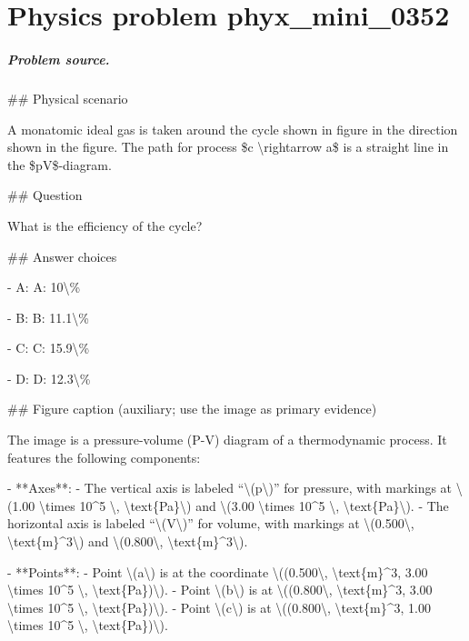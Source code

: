 
\chapter{Physics problem phyx\_mini\_0352}
\label{ch:PhyXMiniProblems_problem_phyx_mini_0352}

\paragraph{Problem source.}
\#\# Physical scenario

A monatomic ideal gas is taken around the cycle shown in figure in the direction shown in the figure. The path for process \$c \textbackslash{}rightarrow a\$ is a straight line in the \$pV\$-diagram.

\#\# Question

What is the efficiency of the cycle?

\#\# Answer choices

- A: A: 10\textbackslash{}\%

- B: B: 11.1\textbackslash{}\%

- C: C: 15.9\textbackslash{}\%

- D: D: 12.3\textbackslash{}\%

\#\# Figure caption (auxiliary; use the image as primary evidence)

The image is a pressure-volume (P-V) diagram of a thermodynamic process. It features the following components:

- **Axes**: 
  - The vertical axis is labeled “\textbackslash{}(p\textbackslash{})” for pressure, with markings at \textbackslash{}(1.00 \textbackslash{}times 10\textasciicircum{}5 \textbackslash{}, \textbackslash{}text\{Pa\}\textbackslash{}) and \textbackslash{}(3.00 \textbackslash{}times 10\textasciicircum{}5 \textbackslash{}, \textbackslash{}text\{Pa\}\textbackslash{}).
  - The horizontal axis is labeled “\textbackslash{}(V\textbackslash{})” for volume, with markings at \textbackslash{}(0.500\textbackslash{}, \textbackslash{}text\{m\}\textasciicircum{}3\textbackslash{}) and \textbackslash{}(0.800\textbackslash{}, \textbackslash{}text\{m\}\textasciicircum{}3\textbackslash{}).

- **Points**:
  - Point \textbackslash{}(a\textbackslash{}) is at the coordinate \textbackslash{}((0.500\textbackslash{}, \textbackslash{}text\{m\}\textasciicircum{}3, 3.00 \textbackslash{}times 10\textasciicircum{}5 \textbackslash{}, \textbackslash{}text\{Pa\})\textbackslash{}).
  - Point \textbackslash{}(b\textbackslash{}) is at \textbackslash{}((0.800\textbackslash{}, \textbackslash{}text\{m\}\textasciicircum{}3, 3.00 \textbackslash{}times 10\textasciicircum{}5 \textbackslash{}, \textbackslash{}text\{Pa\})\textbackslash{}).
  - Point \textbackslash{}(c\textbackslash{}) is at \textbackslash{}((0.800\textbackslash{}, \textbackslash{}text\{m\}\textasciicircum{}3, 1.00 \textbackslash{}times 10\textasciicircum{}5 \textbackslash{}, \textbackslash{}text\{Pa\})\textbackslash{}).

